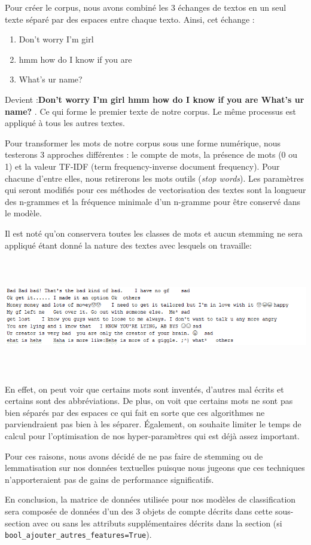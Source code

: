 Pour créer le corpus, nous avons combiné les 3 échanges de textos en un seul texte séparé par des espaces entre chaque texto. Ainsi, cet échange :
\begin{enumerate}
\item Don't worry  I'm girl
\item hmm how do I know if you are
\item What's ur name?
\end{enumerate}
Devient :\textbf{Don't worry  I'm girl hmm how do I know if you are  What's ur name?} . Ce qui forme le premier texte de notre corpus. Le même processus est appliqué à tous les autres textes.

Pour transformer les mots de notre corpus sous une forme numérique, nous testerons 3 approches différentes : le compte de mots, la présence de mots (0 ou 1) et la valeur TF-IDF (term frequency-inverse document frequency). Pour chacune d'entre elles, nous retirerons les mots outils (\emph{stop words}). 
Les paramètres qui seront modifiés pour ces méthodes de vectorisation des textes sont la longueur des n-grammes et la fréquence minimale d'un n-gramme pour être conservé dans le modèle.

Il est noté qu'on conservera toutes les classes de mots et aucun stemming ne sera appliqué étant donné la nature des textes avec lesquels on travaille:

\includegraphics[width=\linewidth,height=5cm]{images/exemples_text}

En effet, on peut voir que certains mots sont inventés, d'autres mal écrits et certains sont des abbréviations. De plus, on voit que certains mots ne sont pas bien séparés par des espaces ce qui fait en sorte que ces algorithmes ne parviendraient pas bien à les séparer. Également, on souhaite limiter le temps de calcul pour l'optimisation de nos hyper-paramètres qui est déjà assez important.

Pour ces raisons, nous avons décidé de ne pas faire de stemming ou de lemmatisation sur nos données textuelles puisque nous jugeons que ces techniques n'apporteraient pas de gains de performance significatifs.

En conclusion, la matrice de données utilisée pour nos modèles de classification sera composée de données d'un des 3 objets de compte décrits dans cette sous-section avec ou sans les attributs supplémentaires décrits dans la section  (si \verb|bool_ajouter_autres_features=True|).
